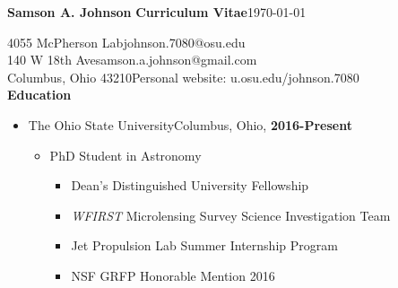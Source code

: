 \documentclass{article}
\begin{document}
\raggedright
{\large\bf{Samson A. Johnson}}\hfill
{\large\bf{Curriculum Vitae}}\hspace{38mm}\today

\noindent\makebox[\linewidth]{\rule{6.5in}{0.4pt}}


\hspace{15mm}4055 McPherson Lab\hfill johnson.7080@osu.edu\\
\hspace{15mm}140 W 18th Ave\hfill samson.a.johnson@gmail.com\\
\hspace{15mm}Columbus, Ohio 43210\hfill Personal website: u.osu.edu/johnson.7080\\








{\large{\bf Education}}

\begin{itemize}
\item[] {\large{The Ohio State University}}\hfill Columbus, Ohio, {\bf{2016-Present}}\\
\begin{itemize}
\item PhD Student in Astronomy
\begin{itemize}
\item[] Dean's Distinguished University Fellowship 
\item[] \textit{WFIRST} Microlensing Survey Science Investigation Team
\item[] Jet Propulsion Lab Summer Internship Program
\item[] NSF GRFP Honorable Mention 2016 
\end{itemize}
\end{itemize}
\end{itemize}
\end{document}
